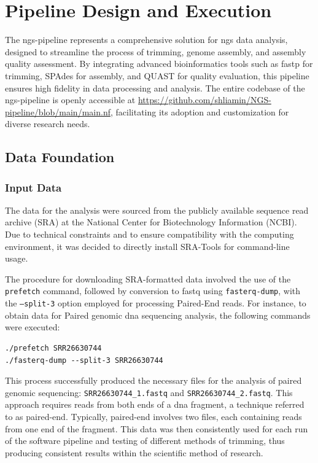 \chapter{Pipeline Design and Execution}

The \gls{ngs}-pipeline represents a comprehensive solution for \gls{ngs} data analysis, designed to streamline the process of \gls{trimming}, \gls{genome} assembly, and \gls{assembly} quality assessment. By integrating advanced bioinformatics tools such as fastp for \gls{trimming}, SPAdes for \gls{assembly}, and QUAST for quality evaluation, this pipeline ensures high fidelity in data processing and analysis. The entire codebase of the \gls{ngs}-pipeline is openly accessible at \url{https://github.com/shliamin/NGS-pipeline/blob/main/main.nf}, facilitating its adoption and customization for diverse research needs.

\section{Data Foundation}

\subsection{Input Data}
The data for the analysis were sourced from the publicly available sequence \gls{read} archive (SRA) at the National Center for Biotechnology Information (NCBI). Due to technical constraints and to ensure compatibility with the computing environment, it was decided to directly install SRA-Tools for command-line usage.

The procedure for downloading SRA-formatted data involved the use of the \texttt{prefetch} command, followed by conversion to \gls{fastq} using \texttt{fasterq-dump}, with the \texttt{--split-3} option employed for processing Paired-End \gls{read}s. For instance, to obtain data for Paired genomic \gls{dna} sequencing analysis, the following commands were executed:
\begin{verbatim}
./prefetch SRR26630744
./fasterq-dump --split-3 SRR26630744
\end{verbatim}

This process successfully produced the necessary files for the analysis of paired genomic \gls{sequencing}: \texttt{SRR26630744\_1.fastq} and \texttt{SRR26630744\_2.fastq}. This approach requires \gls{read}s from both ends of a \gls{dna} fragment, a technique referred to as \gls{paired-end}. Typically, \gls{paired-end} involves two files, each containing \gls{read}s from one end of the fragment. This data was then consistently used for each run of the software pipeline and testing of different methods of \gls{trimming}, thus producing consistent results within the scientific method of research.


